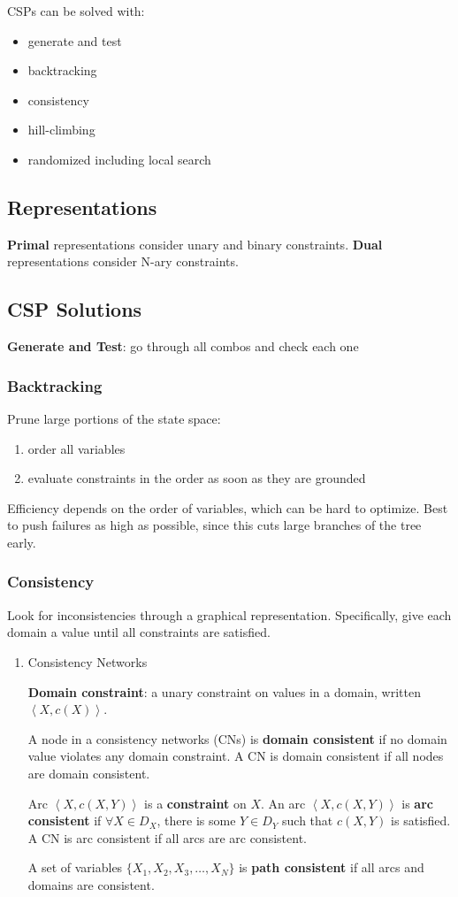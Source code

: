 \documentclass[11pt]{article}
\begin{document}
CSPs can be solved with:
\begin{itemize}
\item generate and test
\item backtracking
\item consistency
\item hill-climbing
\item randomized including local search
\end{itemize}
\subsection{Representations}
\label{sec:org462d42e}
\textbf{Primal} representations consider unary and binary constraints.
\textbf{Dual} representations consider N-ary constraints.
\subsection{CSP Solutions}
\label{sec:org7efa23a}
\textbf{Generate and Test}: go through all combos and check each one
\subsubsection{Backtracking}
\label{sec:orgba57656}
Prune large portions of the state space:
\begin{enumerate}
\item order all variables
\item evaluate constraints in the order as soon as they are grounded
\end{enumerate}

Efficiency depends on the order of variables, which can be hard to optimize.
Best to push failures as high as possible, since this cuts large branches of the tree early.
\subsubsection{Consistency}
\label{sec:orge28738a}
Look for inconsistencies through a graphical representation.
Specifically, give each domain a value until all constraints are satisfied.
\begin{enumerate}
\item Consistency Networks
\label{sec:org6dd8796}

\textbf{Domain constraint}: a unary constraint on values in a domain, written \(\left< X, c(X) \right>\).

A node in a consistency networks (CNs) is \textbf{domain consistent} if no domain value violates any domain constraint.
A CN is domain consistent if all nodes are domain consistent.

Arc \(\left< X, c(X, Y) \right>\) is a \textbf{constraint} on \(X\).
An arc \(\left< X, c(X, Y) \right>\) is \textbf{arc consistent} if \(\forall X \in D_{X}\), there is some
\(Y \in D_{Y}\) such that \(c(X, Y)\) is satisfied.
A CN is arc consistent if all arcs are arc consistent.

A set of variables \(\{ X_{1}, X_{2}, X_{3}, \dots, X_{N} \}\) is \textbf{path consistent} if all arcs
and domains are consistent.
\end{enumerate}
\end{document}
